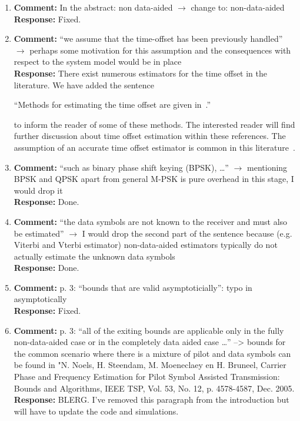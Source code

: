 \documentclass{article}
\begin{document}
\begin{enumerate}

\item \textbf{Comment:} In the abstract: non data-aided $\to$ change to: non-data-aided \\
\textbf{Response:} Fixed.

\item \textbf{Comment:} ``we assume that the time-offset has been previously handled'' $\to$ perhaps some motivation for this assumption and the consequences with respect to the system model would be in place \\
\textbf{Response:}  There exist numerous estimators for the time offset in the literature.  We have added the sentence 

``Methods for estimating the time offset are given in~\cite{Massey1972optimumframe,Oerder_synch_square_circstat_2008,McKilliam_time_offset_pilots_data_2013}.'' 

to inform the reader of some of these methods.  The interested reader will find further discussion about time offset estimation within these references.  The assumption of an accurate time offset estimator is common in this literature~\cite{ViterbiViterbi_phase_est_1983,Cowley_ref_sym_carr_1998,Wilson1989,Makrakis1990,Liu1991,Mackenthun1994,Sweldens2001,McKilliamLinearTimeBlockPSK2009,Divsalar1990}.


\item \textbf{Comment:} ``such as binary phase shift keying (BPSK), \dots'' $\to$ mentioning BPSK and QPSK apart from general M-PSK is pure overhead in this stage, I would drop it \\
\textbf{Response:} Done.

\item \textbf{Comment:} ``the data symbols are not known to the receiver and must also be estimated'' $\to$ I would drop the second part of the sentence because (e.g. Viterbi and Vterbi estimator) non-data-aided estimators typically do not actually estimate the unknown data symbols \\
\textbf{Response:} Done.

\item \textbf{Comment:} p. 3: ``bounds that are valid asymptoticially'': typo in asymptotically \\
\textbf{Response:} Fixed.

\item \textbf{Comment:} p. 3: ``all of the exiting bounds are applicable only in the fully non-data-aided case or in the completely data aided case \dots'' --> bounds for the common scenario where there is a mixture of pilot and data symbols can be found in "N. Noels, H. Steendam, M. Moeneclaey en H. Bruneel, Carrier Phase and Frequency Estimation for Pilot Symbol Assisted Transmission: Bounds and Algorithms, IEEE TSP, Vol. 53, No. 12, p. 4578-4587, Dec. 2005. \\
\textbf{Response:} BLERG. I've removed this paragraph from the introduction but will have to update the code and simulations.


\end{enumerate}
\end{document}
